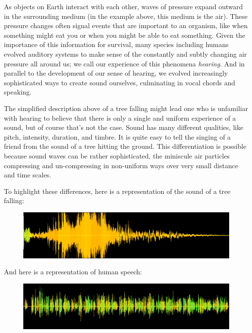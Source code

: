 \documentclass[UTF8]{book}
\begin{document}
\begin{CJK}{UTF8}{gbsn}
As objects on Earth interact with each other, waves of pressure expand outward in the surrounding medium (in the example above, this medium is the air). These pressure changes often signal events that are important to an organism, like when something might eat you or when you might be able to eat something. Given the importance of this information for survival, many species including humans evolved auditory systems to make sense of the constantly and subtly changing air pressure all around us; we call our experience of this phenomena \emph{hearing}. And in parallel to the development of our sense of hearing, we evolved increasingly sophisticated ways to create sound ourselves, culminating in vocal chords and speaking.

The simplified description above of a tree falling might lead one who is unfamiliar with hearing to believe that there is only a single and uniform experience of a sound, but of course that's not the case. Sound has many different qualities, like pitch, intensity, duration, and timbre. It is quite easy to tell the singing of a friend from the sound of a tree hitting the ground. This differentiation is possible because sound waves can be rather sophisticated, the miniscule air particles compressing and un-compressing in non-uniform ways over very small distance and time scales.

To highlight these differences, here is a representation of the sound of a tree falling:

\begin{figure}[H]
\centering
\includegraphics[width=0.8\linewidth]{tree_falling_soundwave}
\end{figure}


And here is a representation of human speech:

\begin{figure}[H]
\centering
\includegraphics[width=0.8\linewidth]{shakespeare_speech}
\end{figure}


\end{CJK}
\end{document}
